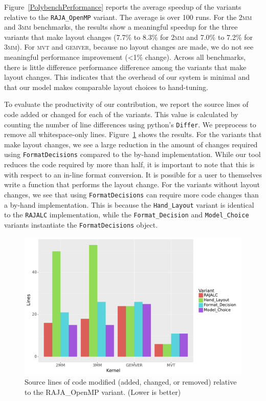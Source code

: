 \documentclass[sigconf]{acmart}
\begin{document}
Figure~\ref{PolybenchPerformance} reports the average speedup of the variants relative to the \verb.RAJA_OpenMP. variant. 
The average is over 100 runs. 
For the \textsc{2mm} and \textsc{3mm} benchmarks, the results show a meaningful speedup for the three variants that make layout changes (7.7\% to 8.3\% for \textsc{2mm} and 7.0\% to 7.2\% for \textsc{3mm}).
For \textsc{mvt} and \textsc{gemver}, because no layout changes are made, we do not see meaningful performance improvement (<1\% change).
Across all benchmarks, there is little difference performance difference among the variants that make layout changes.
This indicates that the overhead of our system is minimal and that our model makes comparable layout choices to hand-tuning.

To evaluate the productivity of our contribution, we report the source lines of code added or changed for each of the variants.
This value is calculated by counting the number of line differences using python's \verb.Differ.. 
We preprocess to remove all whitespace-only lines.
Figure~\ref{PolybenchSLOC} shows the results.
For the variants that make layout changes, we see a large reduction in the amount of changes required using \verb.FormatDecisions. compared to the by-hand implementation. 
While our tool reduces the code required by more than half, it is important to note that this is with respect to an in-line format conversion.
It is possible for a user to themselves write a function that performs the layout change.
For the variants without layout changes, we see that using \verb.FormatDecisions. can require more code changes than a by-hand implementation. 
This is because the \verb.Hand_Layout. variant is identical to the \verb.RAJALC. implementation, while the \verb.Format_Decision. and \verb.Model_Choice. variants instantiate the \verb.FormatDecisions. object.

\begin{figure}
	\includegraphics[width=\columnwidth]{PolybenchSLOC.pdf}
	\caption{Source lines of code modified (added, changed, or removed) relative to the RAJA\_OpenMP variant. (Lower is better)}
	\label{PolybenchSLOC}  
\end{figure}
\end{document}
